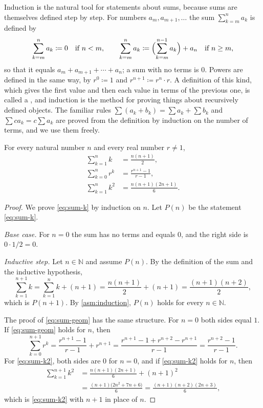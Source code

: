 Induction is the natural tool for statements about sums, because sums are themselves defined step by step. For numbers $a_m,a_{m+1},\ldots$ the sum $\sum_{k=m}^{n}a_k$ is defined by
\[
\sum_{k=m}^{n}a_k\coloneqq0\quad\text{if }n<m,
\qquad
\sum_{k=m}^{n}a_k\coloneqq\Bigl(\sum_{k=m}^{n-1}a_k\Bigr)+a_n\quad\text{if }n\ge m,
\]
so that it equals $a_m+a_{m+1}+\cdots+a_n$; a sum with no terms is $0$. Powers are defined in the same way, by $r^0\coloneqq1$ and $r^{n+1}\coloneqq r^n\cdot r$. A definition of this kind, which gives the first value and then each value in terms of the previous one, is called a , and induction is the method for proving things about recursively defined objects. The familiar rules $\sum(a_k+b_k)=\sum a_k+\sum b_k$ and $\sum ca_k=c\sum a_k$ are proved from the definition by induction on the number of terms, and we use them freely.

\begin{theorem}
\label{thm:sums}
For every natural number $n$ and every real number $r\ne1$,
\begin{align}
\sum_{k=1}^{n}k&=\frac{n(n+1)}{2},\label{eq:sum-k}\\
\sum_{k=0}^{n}r^k&=\frac{r^{n+1}-1}{r-1},\label{eq:sum-geom}\\
\sum_{k=1}^{n}k^2&=\frac{n(n+1)(2n+1)}{6}.\label{eq:sum-k2}
\end{align}
\end{theorem}

\begin{proof}
We prove \eqref{eq:sum-k} by induction on $n$. Let $P(n)$ be the statement \eqref{eq:sum-k}.

\emph{Base case.} For $n=0$ the sum has no terms and equals $0$, and the right side is $0\cdot1/2=0$.

\emph{Inductive step.} Let $n\in\mathbb N$ and assume $P(n)$. By the definition of the sum and the inductive hypothesis,
\[
\sum_{k=1}^{n+1}k=\sum_{k=1}^{n}k+(n+1)=\frac{n(n+1)}{2}+(n+1)=\frac{(n+1)(n+2)}{2},
\]
which is $P(n+1)$. By \cref{asm:induction}, $P(n)$ holds for every $n\in\mathbb N$.

The proof of \eqref{eq:sum-geom} has the same structure. For $n=0$ both sides equal $1$. If \eqref{eq:sum-geom} holds for $n$, then
\[
\sum_{k=0}^{n+1}r^k=\frac{r^{n+1}-1}{r-1}+r^{n+1}=\frac{r^{n+1}-1+r^{n+2}-r^{n+1}}{r-1}=\frac{r^{n+2}-1}{r-1}.
\]
For \eqref{eq:sum-k2}, both sides are $0$ for $n=0$, and if \eqref{eq:sum-k2} holds for $n$, then
\begin{align*}
\sum_{k=1}^{n+1}k^2&=\frac{n(n+1)(2n+1)}{6}+(n+1)^2\\
&=\frac{(n+1)\bigl(2n^2+7n+6\bigr)}{6}=\frac{(n+1)(n+2)(2n+3)}{6},
\end{align*}
which is \eqref{eq:sum-k2} with $n+1$ in place of $n$.
\end{proof}

